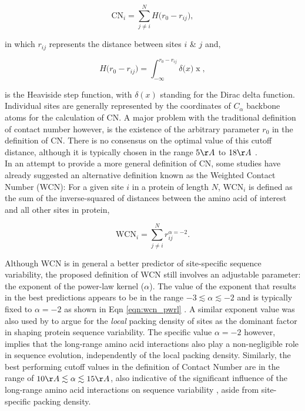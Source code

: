 \documentclass[11pt]{article}
\begin{document}
    \begin{equation}
        \label{eqn:cn}
        \text{CN}_{i} = \sum^N_{j\neq i} H\big(r_0-r_{ij}\big),
    \end{equation}

    \noindent in which $r_{ij}$ represents the distance between sites $i$ \& $j$ and,

    \begin{equation}
        \label{eqn:heaviside}
        H\big(r_0-r_{ij}\big) = \int^{r_0-r_{ij}}_{-\infty}\delta\big(x)\operatorname{x},
    \end{equation}

    \noindent is the Heaviside step function, with $\delta(x)$ standing for the Dirac delta function. Individual sites are generally represented by the coordinates of $C_\alpha$ backbone atoms for the calculation of CN. A major problem with the traditional definition of contact number however, is the existence of the arbitrary parameter $r_0$ in the definition of CN. There is no consensus on the optimal value of this cutoff distance, although it is typically chosen in the range $5\AA$ to $18\AA$ \citep[e.g.,][]{lin_deriving_2008, franzosa_structural_2009, weng_molecular_2014}. \\

    In an attempt to provide a more general definition of CN, some studies \citep[e.g.,][]{lin_deriving_2008} have already suggested an alternative definition known as the Weighted Contact Number (WCN): For a given site $i$ in a protein of length $N$, WCN$_i$ is defined as the sum of the inverse-squared of distances between the amino acid of interest and all other sites in protein,

    \begin{equation}
        \label{eqn:wcn_pwrl}
        \text{WCN}_{i} = \sum^N_{j\neq i} {r_{ij}^{\alpha=-2}}.
    \end{equation}

    Although WCN is in general a better predictor of site-specific sequence variability, the proposed definition of WCN still involves an adjustable parameter: the exponent of the power-law kernel ($\alpha$). The value of the exponent that results in the best predictions appears to be in the range $-3\lesssim\alpha\lesssim-2$ and is typically fixed to $\alpha=-2$ as shown in Eqn \ref{eqn:wcn_pwrl} \citep[e.g.,][]{yang_protein_2009}.  A similar exponent value was also used by \citet{huang_mechanistic_2014} to argue for the {\it local} packing density of sites as the dominant factor in shaping protein sequence variability. The specific value $\alpha=-2$ however, implies that the long-range amino acid interactions also play a non-negligible role in sequence evolution, independently of the local packing density. Similarly, the best performing cutoff values in the definition of Contact Number are in the range of $10\AA\lesssim\alpha\lesssim15\AA$, also indicative of the significant influence of the long-range amino acid interactions on sequence variability \citep[e.g.,][]{franzosa_structural_2009, shahmoradi_predicting_2014}, aside from site-specific packing density. \\
\end{document}
